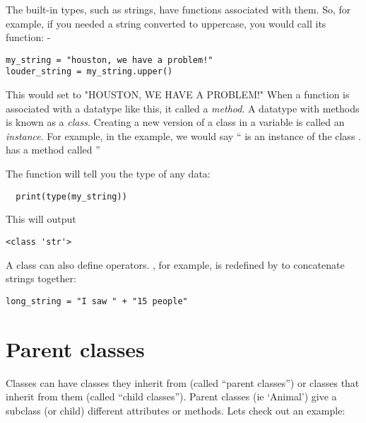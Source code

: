 The built-in types, such as strings, have functions associated with
them. So, for example, if you needed a string converted to uppercase,
you would call its  function:
-
\begin{Verbatim}
my_string = "houston, we have a problem!"
louder_string = my_string.upper()
\end{Verbatim}
This would set  to "HOUSTON, WE HAVE A PROBLEM!"
When a function is associated with a datatype like this, it called a
\emph{method}. A datatype with methods is known as a \emph{class}. Creating a new version of a class in a variable is called an \emph{instance}. For
example, in the example, we would say `` is an instance of
the class .  has a method called ''

The function  will tell you the type of any data:
\begin{Verbatim}
  print(type(my_string))
\end{Verbatim}
This will output
\begin{Verbatim}
<class 'str'>
\end{Verbatim}

A class can also define operators.  \pyfunction{+}, for example, is
redefined by  to concatenate strings together:
\begin{Verbatim}
long_string = "I saw " + "15 people"
\end{Verbatim}

\section{Parent classes}
Classes can have classes they inherit from (called ``parent classes'') or classes that 
inherit from them (called ``child classes''). 
Parent classes (ie `Animal') give a subclass (or child) different attributes or methods. Lets check out an example:

